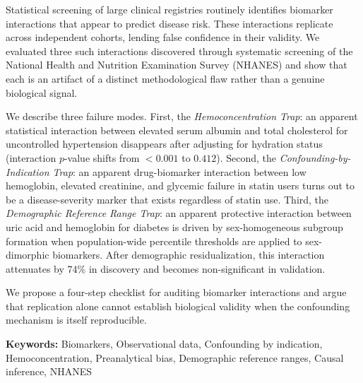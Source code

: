 \documentclass[10pt,letterpaper]{article}
\begin{document}
\begin{tcolorbox}[colback=boxbg, colframe=boxborder, arc=2mm, boxrule=0.8pt, left=12pt, right=12pt, top=10pt, bottom=10pt]
\par\vspace{6pt}
\noindent Statistical screening of large clinical registries routinely identifies biomarker interactions that appear to predict disease risk. These interactions replicate across independent cohorts, lending false confidence in their validity. We evaluated three such interactions discovered through systematic screening of the National Health and Nutrition Examination Survey (NHANES) and show that each is an artifact of a distinct methodological flaw rather than a genuine biological signal.

\vspace{6pt}
\noindent We describe three failure modes. First, the \textit{Hemoconcentration Trap}: an apparent statistical interaction between elevated serum albumin and total cholesterol for uncontrolled hypertension disappears after adjusting for hydration status (interaction $p$-value shifts from $<0.001$ to $0.412$). Second, the \textit{Confounding-by-Indication Trap}: an apparent drug-biomarker interaction between low hemoglobin, elevated creatinine, and glycemic failure in statin users turns out to be a disease-severity marker that exists regardless of statin use. Third, the \textit{Demographic Reference Range Trap}: an apparent protective interaction between uric acid and hemoglobin for diabetes is driven by sex-homogeneous subgroup formation when population-wide percentile thresholds are applied to sex-dimorphic biomarkers. After demographic residualization, this interaction attenuates by 74\% in discovery and becomes non-significant in validation.

\vspace{6pt}
\noindent We propose a four-step checklist for auditing biomarker interactions and argue that replication alone cannot establish biological validity when the confounding mechanism is itself reproducible.

\vspace{8pt}
\noindent\textsf{\textbf{\small Keywords:}} {\small Biomarkers, Observational data, Confounding by indication, Hemoconcentration, Preanalytical bias, Demographic reference ranges, Causal inference, NHANES}
\end{tcolorbox}
\end{document}

